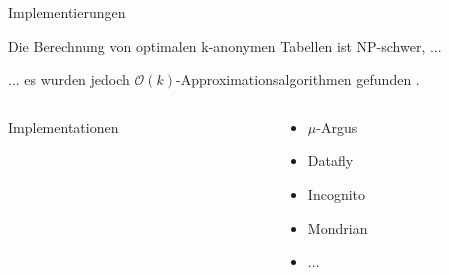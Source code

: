 \begin{frame}[c]{Implementierungen}
	\begin{center}
		Die Berechnung von optimalen k-anonymen Tabellen ist NP-schwer, ...\\
		\pause
		\vspace{0.5cm}

		... es wurden jedoch \(\mathcal{O}(k)\)-Approximationsalgorithmen gefunden \cite{aggarwal, meyerson}.

		\vfill

		\begin{columns}[c]
			\begin{column}{0.5\textwidth}	
				\hfill {Implementationen}
			\end{column}
		
			\begin{column}{0.5\textwidth}
				\begin{itemize}
					\item \(\mu\)-Argus
					\item Datafly
					\item Incognito
					\item Mondrian
					\item ...
				\end{itemize}
			\end{column}
		\end{columns}

	\end{center}
\end{frame}
	
